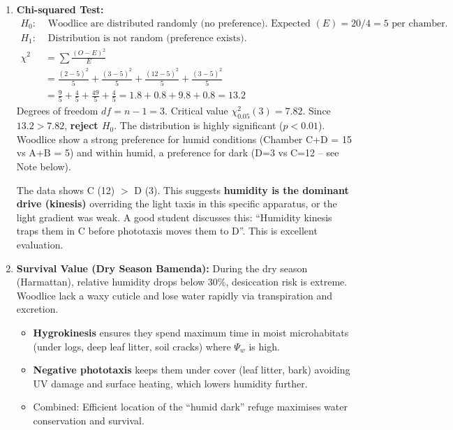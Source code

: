 \documentclass[11pt]{article}
\begin{document}
\begin{enumerate}
    \item \textbf{Chi-squared Test:}
    \begin{align*}
    H_0: &\text{ Woodlice are distributed randomly (no preference). Expected } (E) = 20/4 = 5 \text{ per chamber.} \\
    H_1: &\text{ Distribution is not random (preference exists).} \\
    \chi^2 &= \sum \frac{(O-E)^2}{E} \\
    &= \frac{(2-5)^2}{5} + \frac{(3-5)^2}{5} + \frac{(12-5)^2}{5} + \frac{(3-5)^2}{5} \\
    &= \frac{9}{5} + \frac{4}{5} + \frac{49}{5} + \frac{4}{5} = 1.8 + 0.8 + 9.8 + 0.8 = \mathbf{13.2}
    \end{align*}
    Degrees of freedom $df = n-1 = 3$. Critical value $\chi^2_{0.05}(3) = 7.82$.
    Since $13.2 > 7.82$, \textbf{reject $H_0$}. The distribution is highly significant ($p < 0.01$). Woodlice show a strong preference for humid conditions (Chamber C+D = 15 vs A+B = 5) and within humid, a preference for dark (D=3 vs C=12 -- see Note below).

    \begin{attention}[Interpreting C vs D]
    The data shows C (12) $>$ D (3). This suggests \textbf{humidity is the dominant drive (kinesis)} overriding the light taxis in this specific apparatus, or the light gradient was weak. A good student discusses this: ``Humidity kinesis traps them in C before phototaxis moves them to D''. This is excellent evaluation.
    \end{attention}

    \item \textbf{Survival Value (Dry Season Bamenda):}
    During the dry season (Harmattan), relative humidity drops below 30\%, desiccation risk is extreme. Woodlice lack a waxy cuticle and lose water rapidly via transpiration and excretion.
    \begin{itemize}
        \item \textbf{Hygrokinesis} ensures they spend maximum time in moist microhabitats (under logs, deep leaf litter, soil cracks) where $\Psi_w$ is high.
        \item \textbf{Negative phototaxis} keeps them under cover (leaf litter, bark) avoiding UV damage and surface heating, which lowers humidity further.
        \item Combined: Efficient location of the ``humid dark'' refuge maximises water conservation and survival.
    \end{itemize}


\end{enumerate}
\end{document}
